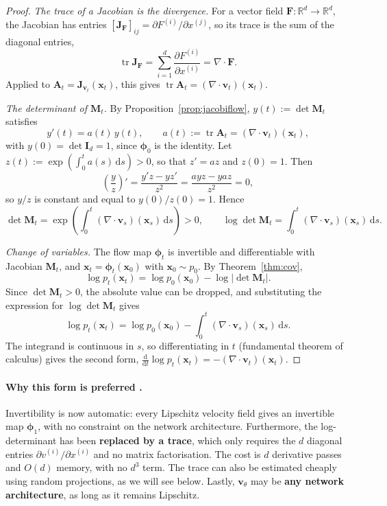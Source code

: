 \documentclass[11pt,a4paper]{article}
\numberwithin{equation}{section}     %
\theoremstyle{plain}        %
\theoremstyle{definition}   %
\theoremstyle{remark}       %
\begin{document}
\begin{proof}
\emph{The trace of a Jacobian is the divergence.} For a vector field $\mathbf{F}:\mathbb{R}^d\to\mathbb{R}^d$, the Jacobian has entries $[\mathbf{J}_{\mathbf{F}}]_{ij}=\partial F^{(i)}/\partial x^{(j)}$, so its trace is the sum of the diagonal entries,
\[
\operatorname{tr}\mathbf{J}_{\mathbf{F}}=\sum_{i=1}^d\frac{\partial F^{(i)}}{\partial x^{(i)}}=\nabla\cdot\mathbf{F}.
\]
Applied to $\mathbf{A}_t=\mathbf{J}_{\mathbf{v}_t}(\mathbf{x}_t)$, this gives $\operatorname{tr}\mathbf{A}_t=(\nabla\cdot\mathbf{v}_t)(\mathbf{x}_t)$.

\emph{The determinant of $\mathbf{M}_t$.} By Proposition~\ref{prop:jacobiflow}, $y(t):=\det\mathbf{M}_t$ satisfies
\[
y'(t)=a(t)\,y(t),\qquad a(t):=\operatorname{tr}\mathbf{A}_t=(\nabla\cdot\mathbf{v}_t)(\mathbf{x}_t),
\]
with $y(0)=\det\mathbf{I}_d=1$, since $\boldsymbol{\phi}_0$ is the identity. Let $z(t):=\exp\left(\int_0^ta(s)\,\mathrm{d}s\right)>0$, so that $z'=az$ and $z(0)=1$. Then
\[
\left(\frac{y}{z}\right)'=\frac{y'z-yz'}{z^2}=\frac{ayz-yaz}{z^2}=0,
\]
so $y/z$ is constant and equal to $y(0)/z(0)=1$. Hence
\[
\det\mathbf{M}_t=\exp\left(\int_0^t(\nabla\cdot\mathbf{v}_s)(\mathbf{x}_s)\,\mathrm{d}s\right)>0,
\qquad
\log\det\mathbf{M}_t=\int_0^t(\nabla\cdot\mathbf{v}_s)(\mathbf{x}_s)\,\mathrm{d}s .
\]

\emph{Change of variables.} The flow map $\boldsymbol{\phi}_t$ is invertible and differentiable with Jacobian $\mathbf{M}_t$, and $\mathbf{x}_t=\boldsymbol{\phi}_t(\mathbf{x}_0)$ with $\mathbf{x}_0\sim p_0$. By Theorem~\ref{thm:cov},
\[
\log p_t(\mathbf{x}_t)=\log p_0(\mathbf{x}_0)-\log\left|\det\mathbf{M}_t\right| .
\]
Since $\det\mathbf{M}_t>0$, the absolute value can be dropped, and substituting the expression for $\log\det\mathbf{M}_t$ gives
\[
\log p_t(\mathbf{x}_t)=\log p_0(\mathbf{x}_0)-\int_0^t(\nabla\cdot\mathbf{v}_s)(\mathbf{x}_s)\,\mathrm{d}s .
\]
The integrand is continuous in $s$, so differentiating in $t$ (fundamental theorem of calculus) gives the second form, $\frac{\mathrm{d}}{\mathrm{d}t}\log p_t(\mathbf{x}_t)=-(\nabla\cdot\mathbf{v}_t)(\mathbf{x}_t)$.
\end{proof}

\paragraph{Why this form is preferred \citep{chen2018,grathwohl2019}.} Invertibility is now automatic: every Lipschitz velocity field gives an invertible map $\boldsymbol{\phi}_1$, with no constraint on the network architecture. Furthermore, the log-determinant has been \textbf{replaced by a trace}, which only requires the $d$ diagonal entries $\partial v^{(i)}/\partial x^{(i)}$ and no matrix factorisation. The cost is $d$ derivative passes and $O(d)$ memory, with no $d^3$ term. The trace can also be estimated cheaply using random projections, as we will see below. Lastly, $\mathbf{v}_\theta$ may be \textbf{any network architecture}, as long as it remains Lipschitz.
\end{document}
